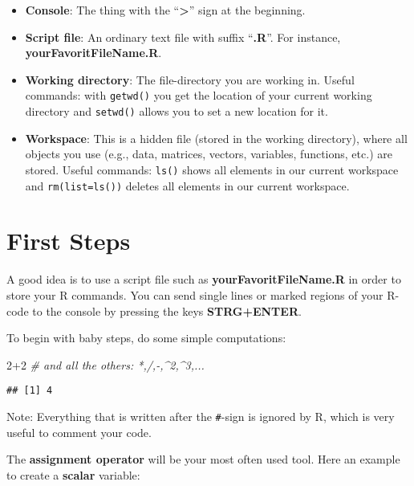 \documentclass[
]{book}
\newenvironment{Shaded}{\begin{snugshade}}{\end{snugshade}}
\newcommand{\CommentTok}[1]{\textcolor[rgb]{0.56,0.35,0.01}{\textit{#1}}}
\newcommand{\DecValTok}[1]{\textcolor[rgb]{0.00,0.00,0.81}{#1}}
\newcommand{\SpecialCharTok}[1]{\textcolor[rgb]{0.00,0.00,0.00}{#1}}
\providecommand{\tightlist}{%
  \setlength{\itemsep}{0pt}\setlength{\parskip}{0pt}}
\begin{document}
\begin{itemize}
\tightlist
\item
  \textbf{Console}: The thing with the ``\textbf{\textgreater{}}'' sign at the beginning.
\item
  \textbf{Script file}: An ordinary text file with suffix ``\textbf{.R}''. For instance, \textbf{yourFavoritFileName.R}.
\item
  \textbf{Working directory}: The file-directory you are working in. Useful commands: with \texttt{getwd()} you get the location of your current working directory and \texttt{setwd()} allows you to set a new location for it.
\item
  \textbf{Workspace}: This is a hidden file (stored in the working directory), where all objects you use (e.g., data, matrices, vectors, variables, functions, etc.) are stored. Useful commands: \texttt{ls()} shows all elements in our current workspace and \texttt{rm(list=ls())} deletes all elements in our current workspace.
\end{itemize}

\hypertarget{first-steps}{%
\section{First Steps}\label{first-steps}}

A good idea is to use a script file such as \textbf{yourFavoritFileName.R} in order to store your R commands. You can send single lines or marked regions of your R-code to the console by pressing the keys \textbf{STRG+ENTER}.

To begin with baby steps, do some simple computations:

\begin{Shaded}
\begin{Highlighting}[]
\DecValTok{2}\SpecialCharTok{+}\DecValTok{2} \CommentTok{\# and all the others: *,/,{-},\^{}2,\^{}3,... }
\end{Highlighting}
\end{Shaded}

\begin{verbatim}
## [1] 4
\end{verbatim}

Note: Everything that is written after the \texttt{\#}-sign is ignored by R, which is very useful to comment your code.

The \textbf{assignment operator} will be your most often used tool. Here an example to create a \textbf{scalar} variable:
\end{document}
